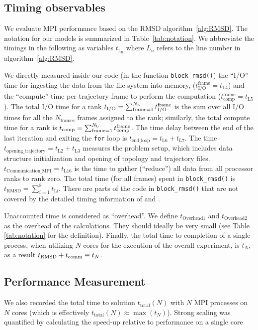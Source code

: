 \label{methods}

\subsection{Timing observables}
We evaluate MPI performance based on the RMSD algorithm~\ref{alg:RMSD}. 
The notation for our models is summarized in Table~\ref{tab:notation}.
We abbreviate the timings in the following as variables $t_{\text{L}_{\text{n}}}$ where $L_{n}$ refers to the line number in algorithm~\ref{alg:RMSD}.

We directly measured inside our code (in the function \texttt{block\_rmsd()}) the ``I/O'' time for
ingesting the data from the file system into memory, ($t_{\text{I/O}}^{\text{frame}} = t_{\text{L4}}$) and the ``compute'' time per
trajectory frame to perform the computation ($t_{\text{comp}}^{\text{frame}} = t_{\text{L5}}$).
The total I/O time for a rank  ${t}_{\text{I/O}} = \sum_{\text{frame}=1}^{N_{\text{b}}} t_{\text{I/O}}^{\text{frame}}$ is the sum over all I/O times for all the $N_{\text{frames}}$ frames assigned to the rank; similarly, the total compute time for a rank is ${t}_{\text{comp}} = \sum_{\text{frame}=1}^{N_{\text{b}}} t_{\text{comp}}^{\text{frame}}$. 
The time delay between the end of the last iteration and exiting the \texttt{for} loop is $t_{\text{end\_loop}} = t_{\text{L6}}+t_{\text{L7}}$.
The time $t_{\text{opening\_trajectory}} = t_{\text{L2}}+t_{\text{L3}}$ measures the problem setup, which includes data structure initialization and opening of topology and trajectory files.
$t_{\text{Communication\_{MPI}}} = t_{\text{L16}}$ is the time to gather (``reduce'') all data from all processor ranks to rank zero.
The total time (for all frames) spent in \texttt{block\_rmsd()} is $t_{\text{RMSD}} = \sum_{i=1}^{8}t_{\text{Li}}$. 
There are parts of the code in \texttt{block\_rmsd()} that are not covered by the detailed timing information of \tcomp and \tIO.

Unaccounted time is considered as ``overhead''. We define
$t_{\text{Overhead1}}$ and $t_{\text{Overhead2}}$ as the overhead of the calculations. They should ideally be very small (see Table \ref{tab:notation} for the definition). Finally, the total time to completion of a single process, when utilizing $N$ cores for the execution of the overall experiment, is $t_{N}$, as a result $t_{\text{RMSD}} + t_{\text{comm}} \equiv t_{N}$.

\subsection{Performance Measurement}
We also recorded the total time to solution $t_{\text{total}}(N)$ with $N$ MPI processes on $N$ cores (which is effectively
$t_{\text{total}}(N) \approx \max(t_{N})$). 
Strong scaling was quantified by calculating the speed-up relative to performance on a single core

